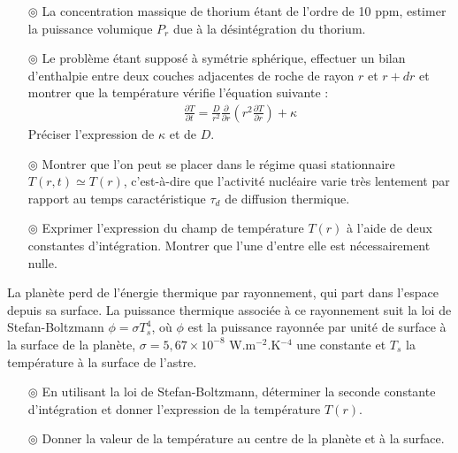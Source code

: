 \documentclass{report}
\begin{document}
\begin{itemize}

	\item[$\circledcirc$] La concentration massique de thorium étant de l'ordre de 10 ppm, estimer la puissance volumique $P_r$ due à la désintégration du thorium.
	
	\item[$\circledcirc$] Le problème étant supposé à symétrie sphérique, effectuer un bilan d'enthalpie entre deux couches adjacentes de roche de rayon $r$ et $r+dr$ et montrer que la température vérifie l'équation suivante :
	\begin{align*}
		\frac{\partial T}{\partial t}=\frac{D}{r^2}\frac{\partial }{\partial r}\left( r^2\frac{\partial T}{\partial r}\right)  + \kappa		
	\end{align*}
Préciser l'expression de $\kappa$ et de $D$.

	\item[$\circledcirc$] Montrer que l'on peut se placer dans le régime quasi stationnaire $T(r,t)\simeq T(r)$, c'est-à-dire que l'activité nucléaire varie très lentement par rapport au temps caractéristique $\tau_d$ de diffusion thermique. 
	
	\item[$\circledcirc$] Exprimer l'expression du champ de température $T(r)$ à l'aide de deux constantes d'intégration. Montrer que l'une d'entre elle est nécessairement nulle.
	
\end{itemize}

	 La planète perd de l'énergie thermique par rayonnement, qui part dans l'espace depuis sa surface. La puissance thermique associée à ce rayonnement suit la loi de Stefan-Boltzmann $\phi=\sigma T_s^4$, où $\phi$ est la puissance rayonnée par unité de surface à la surface de la planète, $\sigma=5,67\times10^{-8}$ W.m$^{-2}$.K$^{-4}$ une constante et $T_s$ la température à la surface de l'astre.

\begin{itemize}

	 \item[$\circledcirc$] En utilisant la loi de Stefan-Boltzmann, déterminer la seconde constante d'intégration et donner l'expression de la température $T(r)$.
	 
	 \item[$\circledcirc$] Donner la valeur de la température au centre de la planète et à la surface.

\end{itemize}	
\end{document}
